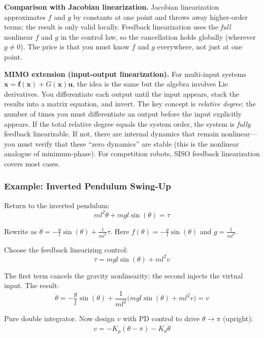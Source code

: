 \textbf{Comparison with Jacobian linearization.} Jacobian linearization approximates $f$ and $g$ by constants at one point and throws away higher-order terms; the result is only valid locally. Feedback linearization uses the \textit{full} nonlinear $f$ and $g$ in the control law, so the cancellation holds globally (wherever $g \neq 0$). The price is that you must know $f$ and $g$ everywhere, not just at one point.

\textbf{MIMO extension (input-output linearization).} For multi-input systems $\dot{\mathbf{x}} = \mathbf{f}(\mathbf{x}) + G(\mathbf{x})\mathbf{u}$, the idea is the same but the algebra involves Lie derivatives. You differentiate each output until the input appears, stack the results into a matrix equation, and invert. The key concept is \textit{relative degree}: the number of times you must differentiate an output before the input explicitly appears. If the total relative degree equals the system order, the system is \textit{fully} feedback linearizable. If not, there are internal dynamics that remain nonlinear---you must verify that these ``zero dynamics'' are stable (this is the nonlinear analogue of minimum-phase). For competition robots, SISO feedback linearization covers most cases.

\subsubsection{Example: Inverted Pendulum Swing-Up}

Return to the inverted pendulum:
\begin{equation}
ml^2 \ddot{\theta} + mgl\sin(\theta) = \tau
\end{equation}

Rewrite as $\ddot{\theta} = -\frac{g}{l}\sin(\theta) + \frac{1}{ml^2}\tau$. Here $f(\theta) = -\frac{g}{l}\sin(\theta)$ and $g = \frac{1}{ml^2}$.

Choose the feedback linearizing control:
\begin{equation}
\tau = mgl\sin(\theta) + ml^2 v
\end{equation}

The first term cancels the gravity nonlinearity; the second injects the virtual input. The result:
\begin{equation}
\ddot{\theta} = -\frac{g}{l}\sin(\theta) + \frac{1}{ml^2}\bigl(mgl\sin(\theta) + ml^2 v\bigr) = v
\end{equation}

Pure double integrator. Now design $v$ with PD control to drive $\theta \to \pi$ (upright):
\begin{equation}
v = -K_p(\theta - \pi) - K_d \dot{\theta}
\end{equation}

